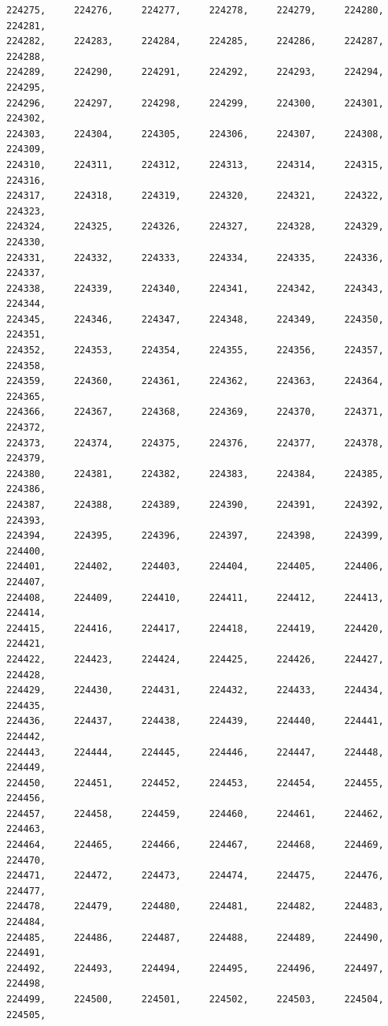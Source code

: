 \documentclass[a4paper,11pt]{report}
\begin{document}
\begin{verbatim}
224275,     224276,     224277,     224278,     224279,     224280,     224281,
224282,     224283,     224284,     224285,     224286,     224287,     224288,
224289,     224290,     224291,     224292,     224293,     224294,     224295,
224296,     224297,     224298,     224299,     224300,     224301,     224302,
224303,     224304,     224305,     224306,     224307,     224308,     224309,
224310,     224311,     224312,     224313,     224314,     224315,     224316,
224317,     224318,     224319,     224320,     224321,     224322,     224323,
224324,     224325,     224326,     224327,     224328,     224329,     224330,
224331,     224332,     224333,     224334,     224335,     224336,     224337,
224338,     224339,     224340,     224341,     224342,     224343,     224344,
224345,     224346,     224347,     224348,     224349,     224350,     224351,
224352,     224353,     224354,     224355,     224356,     224357,     224358,
224359,     224360,     224361,     224362,     224363,     224364,     224365,
224366,     224367,     224368,     224369,     224370,     224371,     224372,
224373,     224374,     224375,     224376,     224377,     224378,     224379,
224380,     224381,     224382,     224383,     224384,     224385,     224386,
224387,     224388,     224389,     224390,     224391,     224392,     224393,
224394,     224395,     224396,     224397,     224398,     224399,     224400,
224401,     224402,     224403,     224404,     224405,     224406,     224407,
224408,     224409,     224410,     224411,     224412,     224413,     224414,
224415,     224416,     224417,     224418,     224419,     224420,     224421,
224422,     224423,     224424,     224425,     224426,     224427,     224428,
224429,     224430,     224431,     224432,     224433,     224434,     224435,
224436,     224437,     224438,     224439,     224440,     224441,     224442,
224443,     224444,     224445,     224446,     224447,     224448,     224449,
224450,     224451,     224452,     224453,     224454,     224455,     224456,
224457,     224458,     224459,     224460,     224461,     224462,     224463,
224464,     224465,     224466,     224467,     224468,     224469,     224470,
224471,     224472,     224473,     224474,     224475,     224476,     224477,
224478,     224479,     224480,     224481,     224482,     224483,     224484,
224485,     224486,     224487,     224488,     224489,     224490,     224491,
224492,     224493,     224494,     224495,     224496,     224497,     224498,
224499,     224500,     224501,     224502,     224503,     224504,     224505,

\end{verbatim}
\end{document}
